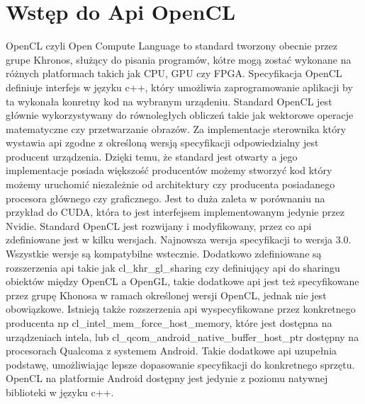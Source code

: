\section[Wstęp do Api OpenCL]{Wstęp do Api OpenCL}
OpenCL czyli Open Compute Language to standard tworzony obecnie przez grupe Khronos, służący do pisania programów, kótre mogą zostać wykonane na różnych platformach takich jak CPU, GPU czy FPGA. Specyfikacja OpenCL definiuje interfejs w języku c++, który umożliwia zaprogramowanie aplikacji by ta wykonała konretny kod na wybranym urządeniu. Standard OpenCL jest głównie wykorzystywany do równoległych obliczeń takie jak wektorowe operacje matematyczne czy przetwarzanie obrazów. Za implementacje sterownika który wystawia api zgodne z określoną wersją specyfikacji odpowiedzialny jest producent urządzenia.  Dzięki temu, że standard jest otwarty a jego implementacje posiada większość producentów możemy stworzyć kod który możemy uruchomić niezależnie od architektury czy producenta posiadanego procesora głównego czy graficznego. Jest to duża zaleta w porównaniu na przykład do CUDA, która to jest interfejsem implementowanym jedynie przez Nvidie. Standard OpenCL jest rozwijany i modyfikowany, przez co api zdefiniowane jest w kilku wersjach. Najnowsza wersja specyfikacji to wersja 3.0. Wszystkie wersje są kompatybilne wstecznie. Dodatkowo zdefiniowane są rozszerzenia api takie jak cl\_khr\_gl\_sharing czy definiujący api do sharingu obiektów między OpenCL a OpenGL, takie dodatkowe api jest też specyfikowane przez grupę Khonosa w ramach określonej wersji OpenCL, jednak nie jest obowiązkowe. Istnieją także rozszerzenia api wyspecyfikowane przez konkretnego producenta np cl\_intel\_mem\_force\_host\_memory, które jest dostępna na urządzeniach intela, lub cl\_qcom\_android\_native\_buffer\_host\_ptr dostępny na procesorach Qualcoma z systemem Android. Takie dodatkowe api uzupełnia podstawę, umożliwiając lepsze dopasowanie specyfikacji do konkretnego sprzętu. OpenCL na platformie Android dostępny jest jedynie z poziomu natywnej biblioteki w języku c++.

\label{chap:goal}
